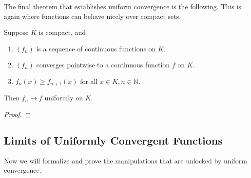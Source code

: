   The final theorem that establishes uniform convergence is the following. This is again where functions can behave nicely over compact sets. 

  \begin{theorem}
    \label{thm:dini}
    Suppose $K$ is compact, and 
    \begin{enumerate}
      \item $(f_n)$ is a sequence of continuous functions on $K$. 
      \item $(f_n)$ converges pointwise to a continuous function $f$ on $K$. 
      \item $f_n (x) \geq f_{n+1} (x)$ for all $x \in K, n \in \mathbb{N}$. 
    \end{enumerate}
    Then $f_n \to f$ uniformly on $K$. 
  \end{theorem} 
  \begin{proof}
    
  \end{proof}

\subsection{Limits of Uniformly Convergent Functions} 

  Now we will formalize and prove the manipulations that are unlocked by uniform convergence. 

